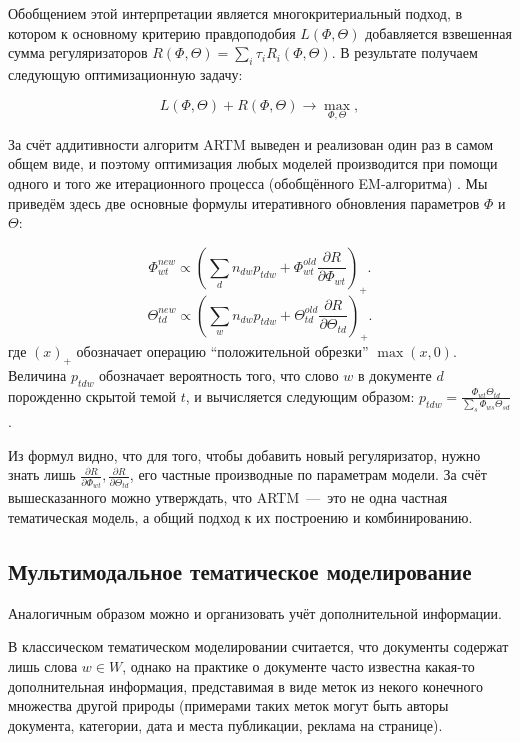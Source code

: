 Обобщением этой интерпретации является многокритериальный подход, в котором к основному критерию правдоподобия $L(\Phi, \Theta)$ 
добавляется взвешенная сумма регуляризаторов $R(\Phi, \Theta) = \sum_i \tau_i R_i(\Phi, \Theta)$. В результате получаем следующую оптимизационную задачу:

\begin{equation} \label{eq:EM}
L(\Phi, \Theta) + R(\Phi, \Theta) \to \max_{\Phi, \Theta},
\end{equation}

За счёт аддитивности алгоритм ARTM  выведен и реализован один раз в самом общем виде, и поэтому оптимизация любых моделей  производится при помощи одного и того же итерационного процесса  (обобщённого EM-алгоритма)  \cite{vorontsov2014additive,vorontsov2015}. Мы приведём здесь две основные формулы итеративного обновления параметров $\Phi$ и $\Theta$:

\begin{equation} \label{eq:Mstep_Theta}
\Phi_{wt}^{new}  \propto \left( \sum_{d} n_{dw} p_{tdw} + \Phi_{wt}^{old} \frac{\partial{R}}{\partial{\Phi_{wt}}}\right)_{+}.
\end{equation}
\[
\Theta_{td}^{new}  \propto \left( \sum_{w} n_{dw} p_{tdw} + \Theta_{td}^{old} \frac{\partial{R}}{\partial{\Theta_{td}}}\right)_{+}.
\]
где $\left( x \right)_{+}$ обозначает операцию ``положительной обрезки'' $\max(x, 0)$. Величина $p_{tdw}$ обозначает вероятность того, что слово $w$ в документе $d$ порожденно скрытой темой $t$, и вычисляется следующим образом: $p_{tdw} = \frac{\Phi_{wt} \Theta_{td}}{\sum_s \Phi_{ws} \Theta_{sd}}$.

Из формул видно, что для того, чтобы добавить новый регуляризатор, нужно знать лишь $\frac{\partial{R}}{\partial{\Phi_{wt}}}, \frac{\partial{R}}{\partial{\Theta_{td}}}$, его частные производные по параметрам модели. За счёт вышесказанного можно утверждать, что ARTM~---~это не одна частная тематическая модель, а общий подход к их построению и комбинированию.

\subsection{Мультимодальное тематическое моделирование}

Аналогичным образом можно и организовать учёт дополнительной информации. 

В классическом тематическом моделировании считается, что документы содержат лишь слова $w \in W$, однако на практике о документе часто известна какая-то дополнительная информация, представимая в виде меток из некого конечного множества другой природы (примерами таких меток могут быть авторы документа, категории, дата и места публикации, реклама на странице). 

